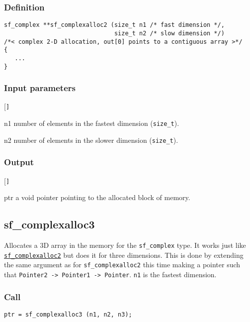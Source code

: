 \subsubsection*{Definition}
\begin{verbatim}
sf_complex **sf_complexalloc2 (size_t n1 /* fast dimension */, 
                               size_t n2 /* slow dimension */)
/*< complex 2-D allocation, out[0] points to a contiguous array >*/ 
{
   ...
}
\end{verbatim}

\subsubsection*{Input parameters}
\begin{desclist}{\tt }{\quad}[\tt ]
   \setlength\itemsep{0pt}
   \item[n1] number of elements in the fastest dimension (\texttt{size\_t}).
   \item[n2] number of elements in the slower dimension (\texttt{size\_t}).
\end{desclist}

\subsubsection*{Output}
\begin{desclist}{\tt }{\quad}[\tt ]
   \setlength\itemsep{0pt}
   \item[ptr] a void pointer pointing to the allocated block of memory.
\end{desclist}




\subsection{{sf\_complexalloc3}}
Allocates a 3D array in the memory for the  \texttt{sf\_complex} type. It works just like \hyperref[sec:sf_complexalloc2]{\texttt{sf\_complexalloc2}} but does it for three dimensions. This is done by extending the same argument as for \texttt{sf\_complexalloc2} this time making a pointer such that \texttt{Pointer2 -> Pointer1 -> Pointer}. \texttt{n1} is the fastest dimension.

\subsubsection*{Call}
\begin{verbatim}ptr = sf_complexalloc3 (n1, n2, n3);\end{verbatim}

